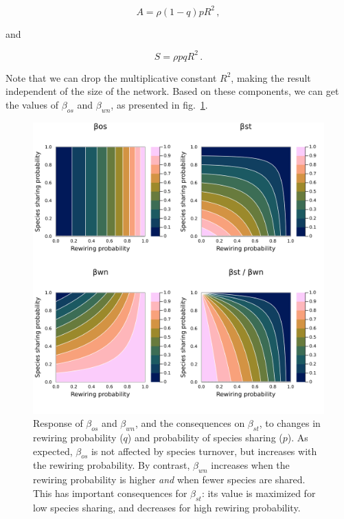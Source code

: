 \documentclass[11pt]{article}
\makeatletter
\def\maxwidth{\ifdim\Gin@nat@width>\linewidth\linewidth
\else\Gin@nat@width\fi}
\let\Oldincludegraphics\includegraphics
\renewcommand{\includegraphics}[1]{\Oldincludegraphics[width=\maxwidth]{#1}}
\makeatother
\begin{document}
\[A = \rho (1-q) p R^2\,,\]

and

\[S = \rho pq R^2\,.\]

Note that we can drop the multiplicative constant \(R^2\), making the
result independent of the size of the network. Based on these
components, we can get the values of \(\beta_{os}\) and \(\beta_{wn}\),
as presented in fig.~\ref{fig:numexp2}.

\begin{figure}
\hypertarget{fig:numexp2}{%
\centering
\includegraphics{figures/numexp2.png}
\caption{Response of \(\beta_{os}\) and \(\beta_{wn}\), and the
consequences on \(\beta_{st}\), to changes in rewiring probability
(\(q\)) and probability of species sharing (\(p\)). As expected,
\(\beta_{os}\) is not affected by species turnover, but increases with
the rewiring probability. By contrast, \(\beta_{wn}\) increases when the
rewiring probability is higher \emph{and} when fewer species are shared.
This has important consequences for \(\beta_{st}\): its value is
maximized for low species sharing, and decreases for high rewiring
probability.}\label{fig:numexp2}
}
\end{figure}
\end{document}
